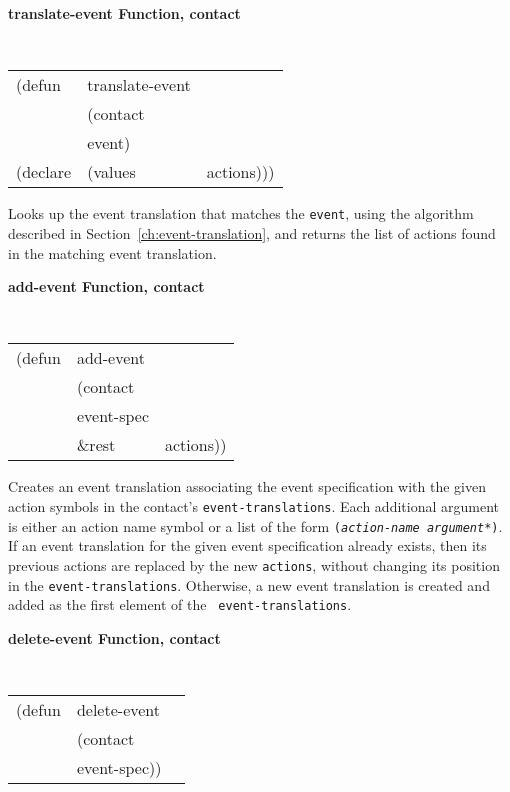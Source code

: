 {\samepage 
{\large {\bf translate-event \hfill Function, contact}}
\begin{flushright} \parbox[t]{6.125in}{
\tt
\begin{tabular}{lll}
\raggedright
(defun & translate-event & \\
& (contact\\
& event) \\
(declare &(values &actions)))
\end{tabular}
\rm

}\end{flushright}}

\begin{flushright} \parbox[t]{6.125in}{
Looks up the event translation that matches the {\tt event}, using the
algorithm described in Section~\ref{ch:event-translation}, and returns
the list of actions found in the matching event translation.

}\end{flushright}

{\samepage
{\large {\bf add-event \hfill Function, contact}} 
\begin{flushright} \parbox[t]{6.125in}{
\tt
\begin{tabular}{lll}
\raggedright
(defun & add-event & \\ 
& (contact\\
&  event-spec\\
& \&rest & actions))
\end{tabular}
\rm

}\end{flushright}}

\begin{flushright} \parbox[t]{6.125in}{
Creates an event translation associating the event specification with the given 
action symbols in the
contact's {\tt event-translations}.
Each additional argument is either an action name symbol or a list of the form
{\tt ({\em action-name argument*})}.  
If an event translation for the given event specification already exists, then
its previous actions are replaced by the new {\tt actions}, without changing its
position in the {\tt event-translations}. Otherwise, a new event translation is
created and added as the first element of the {\tt
event-translations}.  
}\end{flushright}

{\samepage
{\large {\bf delete-event \hfill Function, contact}}
\begin{flushright} \parbox[t]{6.125in}{
\tt
\begin{tabular}{lll}
\raggedright
(defun & delete-event & \\ 
& (contact\\
&  event-spec))
\end{tabular}
\rm

}\end{flushright}
}

